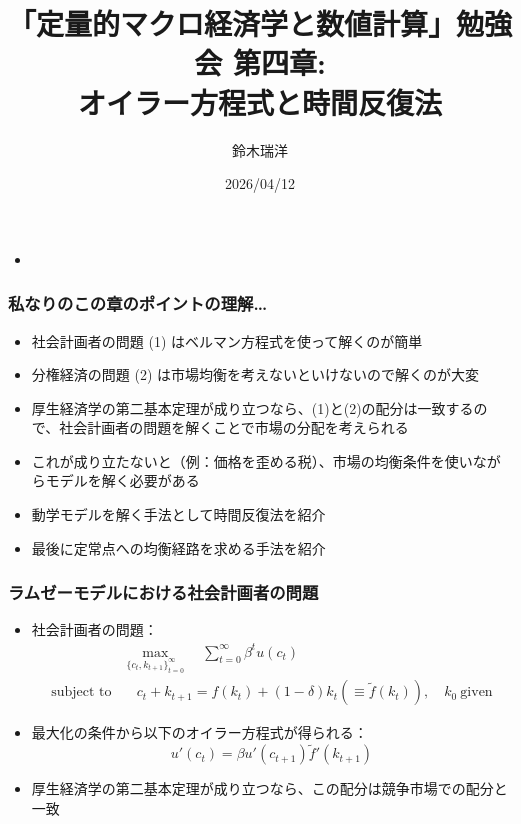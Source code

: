 \documentclass[unicode,9pt]{beamer}%
\title{「定量的マクロ経済学と数値計算」勉強会 第四章: \\ オイラー方程式と時間反復法}
\author{鈴木瑞洋}
\date{2026/04/12}
\begin{document}
\begin{frame}
\titlepage
\end{frame}

\begin{frame}\frametitle{}
  \begin{itemize}
      \item 
  \end{itemize}
\end{frame}

\begin{frame}\frametitle{私なりのこの章のポイントの理解\dots}
  \begin{itemize}
    \item 社会計画者の問題 (1) はベルマン方程式を使って解くのが簡単
    \item 分権経済の問題 (2) は市場均衡を考えないといけないので解くのが大変
    \item 厚生経済学の第二基本定理が成り立つなら、(1)と(2)の配分は一致するので、社会計画者の問題を解くことで市場の分配を考えられる
    \item これが成り立たないと（例：価格を歪める税）、市場の均衡条件を使いながらモデルを解く必要がある
      \bigskip
    \item 動学モデルを解く手法として時間反復法を紹介
    \item 最後に定常点への均衡経路を求める手法を紹介
      \bigskip
  \end{itemize}
\end{frame}

\begin{frame}\frametitle{ラムゼーモデルにおける社会計画者の問題}
  \begin{itemize}
      \item 社会計画者の問題：
        \begin{align*}
          &\max_{\{c_t, k_{t+1}\}_{t=0}^{\infty}} \quad \sum_{t=0}^{\infty} \beta^t u(c_t) \\
          \text{subject to} &\quad c_t + k_{t+1} = f(k_t) + (1 - \delta) k_t \left( \equiv \tilde{f}(k_{t}) \right), \quad k_0 \ \text{given}
        \end{align*}
      \item 最大化の条件から以下のオイラー方程式が得られる：
        $$
        u'(c_t) = \beta u'(c_{t+1}) \tilde{f}'(k_{t+1})
        $$
      \item 厚生経済学の第二基本定理が成り立つなら、この配分は競争市場での配分と一致
  \end{itemize}
\end{frame}
\end{document}
